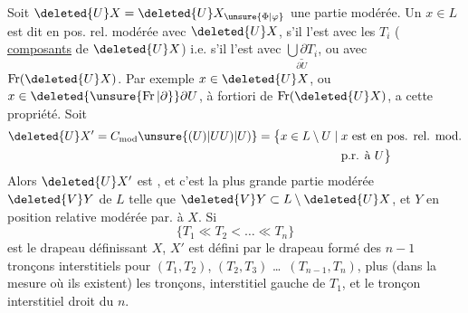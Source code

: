 
 Soit $\deleted{U}X=\deleted{U}X_{\unsure{\Phi|\varphi}}$ une partie modérée. Un $x\in L$ est dit en pos. rel. modérée avec $\deleted{U}X$, s'il l'est avec les $T_i$ ( \uline{composants} de $\deleted{U}X$) i.e. s'il l'est avec $\underset{\partial U}{\underline{\bigcup\partial T_i}}$, ou  avec $\operatorname{Fr}(\deleted{U}X)$.
Par exemple  $x\in\deleted{U}X$, ou $x\in\deleted{\unsure{\operatorname{Fr}|\partial}}\partial U$, à fortiori de $\operatorname{Fr}(\deleted{U}X)$, a cette propriété. Soit
\[
\begin{aligned}
\deleted{U}X'=C_{\mathrm{mod}}\unsure{(U)|U U)|U)}=\bigl\{x\in L\setminus U\mid{}&x\text{ est en pos. rel. mod.}\\
&\text{p.r. à }U\bigr\}
\end{aligned}
\]
Alors  $\deleted{U}X'$ est , et c'est la plus grande partie modérée $\deleted{V}Y$ de $L$ telle que $\deleted{V}Y\subset L\setminus\deleted{U}X$, et $Y$ en position relative modérée par. à $X$. Si
\[
\{T_1\ll T_2<\ldots\ll T_n\}
\]
est le drapeau définissant  $X$, $X'$ est défini par le drapeau formé des $n-1$ tronçons interstitiels  pour $(T_1,T_2)$, $(T_2,T_3)$ \ldots\ $(T_{n-1},T_n)$, plus (dans la mesure où ils existent) les tronçons, interstitiel gauche de $T_1$, et le tronçon interstitiel droit du $n$. 
